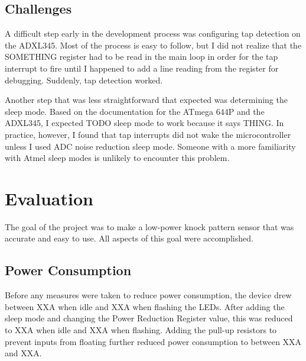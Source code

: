 \documentclass[conference]{./IEEEtran}
\begin{document}
\subsection{Challenges}
A difficult step early in the development process was configuring tap detection on the ADXL345. Most of the process is easy to follow, but I did not realize that the SOMETHING register had to be read in the main loop in order for the tap interrupt to fire until I happened to add a line reading from the register for debugging. Suddenly, tap detection worked.  

Another step that was less straightforward that expected was determining the sleep mode. Based on the documentation for the ATmega 644P and the ADXL345, I expected TODO sleep mode to work because it says THING. In practice, however, I found that tap interrupts did not wake the microcontroller unless I used ADC noise reduction sleep mode. Someone with a more familiarity with Atmel sleep modes is unlikely to encounter this problem.

\section{Evaluation}
The goal of the project was to make a low-power knock pattern sensor that was accurate and easy to use. All aspects of this goal were accomplished. 

\subsection{Power Consumption}
Before any measures were taken to reduce power consumption, the device drew between XXA when idle and XXA when flashing the LEDs. After adding the sleep mode and changing the Power Reduction Register value, this was reduced to XXA when idle and XXA when flashing. Adding the pull-up resistors to prevent inputs from floating further reduced power consumption to between XXA and XXA. 
\end{document}
